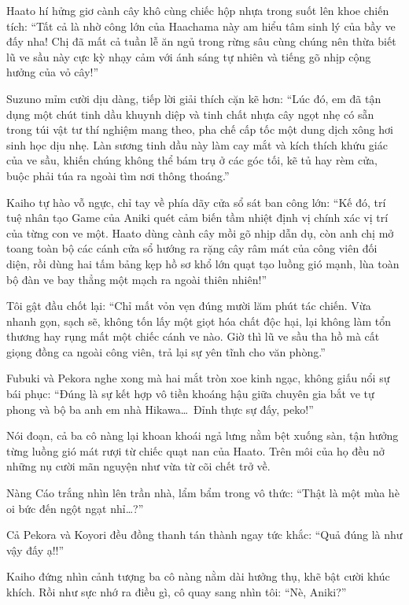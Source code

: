 \documentclass[../main.tex]{subfiles}
\begin{document}
Haato hí hửng giơ cành cây khô cùng chiếc hộp nhựa trong suốt lên khoe chiến tích: ``Tất cả là nhờ công lớn của Haachama này am hiểu tâm sinh lý của bầy ve đấy nha! Chị đã mất cả tuần lễ ăn ngủ trong rừng sâu cùng chúng nên thừa biết lũ ve sầu này cực kỳ nhạy cảm với ánh sáng tự nhiên và tiếng gõ nhịp cộng hưởng của vỏ cây!''

Suzuno mỉm cười dịu dàng, tiếp lời giải thích cặn kẽ hơn: ``Lúc đó, em đã tận dụng một chút tinh dầu khuynh diệp và tinh chất nhựa cây ngọt nhẹ có sẵn trong túi vật tư thí nghiệm mang theo, pha chế cấp tốc một dung dịch xông hơi sinh học dịu nhẹ. Làn sương tinh dầu này làm cay mắt và kích thích khứu giác của ve sầu, khiến chúng không thể bám trụ ở các góc tối, kẽ tủ hay rèm cửa, buộc phải túa ra ngoài tìm nơi thông thoáng.''

Kaiho tự hào vỗ ngực, chỉ tay về phía dãy cửa sổ sát ban công lớn: ``Kế đó, trí tuệ nhân tạo Game của Aniki quét cảm biến tầm nhiệt định vị chính xác vị trí của từng con ve một. Haato dùng cành cây mồi gõ nhịp dẫn dụ, còn anh chị mở toang toàn bộ các cánh cửa sổ hướng ra rặng cây râm mát của công viên đối diện, rồi dùng hai tấm bảng kẹp hồ sơ khổ lớn quạt tạo luồng gió mạnh, lùa toàn bộ đàn ve bay thẳng một mạch ra ngoài thiên nhiên!''

Tôi gật đầu chốt lại: ``Chỉ mất vỏn vẹn đúng mười lăm phút tác chiến. Vừa nhanh gọn, sạch sẽ, không tốn lấy một giọt hóa chất độc hại, lại không làm tổn thương hay rụng mất một chiếc cánh ve nào. Giờ thì lũ ve sầu tha hồ mà cất giọng đồng ca ngoài công viên, trả lại sự yên tĩnh cho văn phòng.''

Fubuki và Pekora nghe xong mà hai mắt tròn xoe kinh ngạc, không giấu nổi sự bái phục: ``Đúng là sự kết hợp vô tiền khoáng hậu giữa chuyên gia bắt ve tự phong và bộ ba anh em nhà Hikawa\dots\ Đỉnh thực sự đấy, peko!''

Nói đoạn, cả ba cô nàng lại khoan khoái ngả lưng nằm bệt xuống sàn, tận hưởng từng luồng gió mát rượi từ chiếc quạt nan của Haato. Trên môi của họ đều nở những nụ cười mãn nguyện như vừa từ cõi chết trở về.

Nàng Cáo trắng nhìn lên trần nhà, lẩm bẩm trong vô thức: ``Thật là một mùa hè oi bức đến ngột ngạt nhỉ\dots?''

Cả Pekora và Koyori đều đồng thanh tán thành ngay tức khắc: ``Quả đúng là như vậy đấy ạ!!''

Kaiho đứng nhìn cảnh tượng ba cô nàng nằm dài hưởng thụ, khẽ bật cười khúc khích. Rồi như sực nhớ ra điều gì, cô quay sang nhìn tôi: ``Nè, Aniki?''
\end{document}
